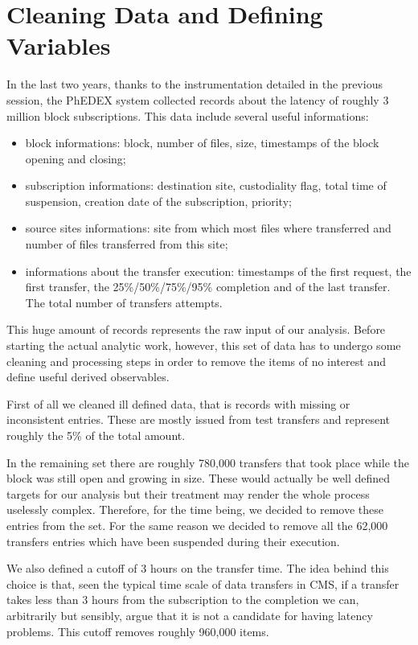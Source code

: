 \section{Cleaning Data and Defining Variables}

In the last two years, thanks to the instrumentation detailed in the
previous session, the PhEDEX system collected records about the
latency of roughly 3 million block subscriptions.  This data include
several useful informations:

\begin{itemize}
\item block informations: block, number of files, size, timestamps of
    the block opening and closing;
\item subscription informations: destination site, custodiality flag,
    total time of suspension, creation date of the subscription,
    priority;
\item source sites informations: site from which most files where
    transferred and number of files transferred from this site;

\item informations about the transfer execution: timestamps of the first
    request, the first transfer, the 25\%/50\%/75\%/95\% completion and of
    the last transfer. The total number of transfers attempts.
\end{itemize}

This huge amount of records represents the raw input of our
analysis. Before starting the actual analytic work, however, this set
of data has to undergo some cleaning and processing steps in order to
remove the items of no interest and define useful derived observables.

First of all we cleaned ill defined data, that is records with missing
or inconsistent entries. These are mostly issued from test transfers
and represent roughly the 5\% of the total amount.

In the remaining set there are roughly 780,000 transfers that took
place while the block was still open and growing in size. These would
actually be well defined targets for our analysis but their treatment
may render the whole process uselessly complex. Therefore, for the
time being, we decided to remove these entries from the set. For the
same reason we decided to remove all the 62,000 transfers entries
which have been suspended during their execution.

We also defined a cutoff of 3 hours on the transfer time. The idea
behind this choice is that, seen the typical time scale of data
transfers in CMS, if a transfer takes less than 3 hours from the
subscription to the completion we can, arbitrarily but sensibly, argue
that it is not a candidate for having latency problems. This cutoff
removes roughly 960,000 items.

